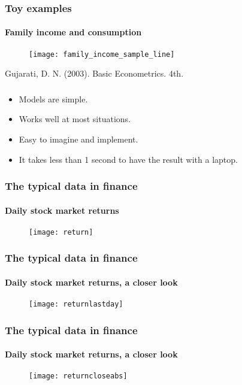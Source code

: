\documentclass[11pt]{beamer}
\begin{document}
\begin{frame}
\frametitle{Toy examples}
\framesubtitle{Family income and consumption}
      \begin{figure}
        \centering
        \texttt{[image: family\_income\_sample\_line]}
      \end{figure}
\tiny{Gujarati, D. N. (2003). Basic Econometrics. 4th.}
\end{frame}

\begin{frame}
  \frametitle{}
  \begin{itemize}
  \item Models are simple.
  \item Works well at most situations.
  \item Easy to imagine and implement.
  \item It takes less than 1 second to have the result with a laptop.
  \end{itemize}

\end{frame}

\begin{frame}
  \frametitle{The typical data in finance}
\framesubtitle{Daily stock market returns}
  \begin{figure}
    \centering
    \texttt{[image: return]}
  \end{figure}
\end{frame}




\begin{frame}
  \frametitle{The typical data in finance}
\framesubtitle{Daily stock market returns, a closer look}
  \begin{figure}
    \centering
    \texttt{[image: returnlastday]}
  \end{figure}
\end{frame}

\begin{frame}
  \frametitle{The typical data in finance}
  \framesubtitle{Daily stock market returns, a closer look}
  \begin{figure}
    \centering
    \texttt{[image: returncloseabs]}
  \end{figure}
\end{frame}
\end{document}
